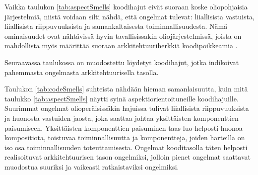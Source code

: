 \documentclass[finnish]{tktltiki2}
\numberwithin{table}{section}
\theoremstyle{definition}
\theoremstyle{remark}
\begin{document}

\noindent
Vaikka taulukon \ref{tab:aspectSmells} koodihajut eivät suoraan koske oliopohjaisia järjestelmiä, niistä voidaan silti nähdä, että ongelmat tulevat: liiallisista vastuista, liiallisista riippuvuuksista ja samankaltaisesta toiminnallisuudesta. Nämä ominaisuudet ovat nähtävissä hyvin tavallisissakin oliojärjestelmissä, joista on mahdollista myös määrittää suoraan arkkitehtuuriherkkiä koodipoikkeamia \citep{macia_enhancing_2013}.

Seuraavassa taulukossa on muodostettu löydetyt koodihajut, jotka indikoivat pahemmasta ongelmasta arkkitehtuurisella tasolla.



\begin{table}[h]
	\centering
	\setlength{\extrarowheight}{1pt}%
	\caption{Olioperäisten koodihajujen ja arkkitehtuuristen hajujen suhde, sekä niiden syyt.}
	\label{tab:codeSmells}
\end{table}


\noindent
Taulukon \ref{tab:codeSmells} suhteista nähdään hieman samanlaisuutta, kuin mitä taulukko \ref{tab:aspectSmells} näytti syinä aspektiorientoituneille koodihajuille. Suurimmat ongelmat olioperäisissäkin hajuissa tulivat liiallisista riippuvuuksista ja huonosta vastuiden jaosta, joka saattaa johtaa yksittäisten komponenttien paisumiseen. Yksittäisten komponenttien paisuminen taas luo helposti huonoa kompositiota, toistuvaa toiminnallisuutta ja komponentteja, joiden harteilla on iso osa toiminnallisuuden toteuttamisesta. 
Ongelmat kooditasolla täten helposti realisoituvat arkkitehtuurisen tason ongelmiksi, jolloin pienet ongelmat saattavat muodostua suuriksi ja vaikeasti ratkaistaviksi ongelmiksi.
\end{document}

